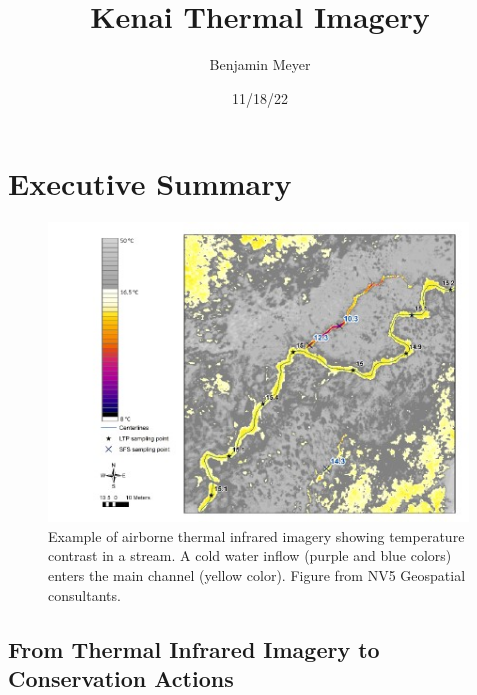 \documentclass[
  letterpaper,
  DIV=11,
  numbers=noendperiod]{scrreprt}
\title{Kenai Thermal Imagery}
\author{Benjamin Meyer}
\date{11/18/22}
\renewcommand*\contentsname{Table of contents}
\newcommand\contentsname{Table of contents}
\begin{document}
\maketitle
\ifdefined\Shaded\renewenvironment{Shaded}{\begin{tcolorbox}[boxrule=0pt, borderline west={3pt}{0pt}{shadecolor}, frame hidden, enhanced, breakable, sharp corners, interior hidden]}{\end{tcolorbox}}\fi

\renewcommand*\contentsname{Table of contents}
{
\hypersetup{linkcolor=}
\setcounter{tocdepth}{2}
\tableofcontents
}

\hypertarget{executive-summary}{%
\chapter*{Executive Summary}\label{executive-summary}}


\begin{figure}

{\centering \includegraphics[width=\textwidth,height=3.125in]{./images/example_TIR_figure.jpg}

}

\caption{Example of airborne thermal infrared imagery showing
temperature contrast in a stream. A cold water inflow (purple and blue
colors) enters the main channel (yellow color). Figure from NV5
Geospatial consultants.}

\end{figure}

\hypertarget{from-thermal-infrared-imagery-to-conservation-actions}{%
\section*{From Thermal Infrared Imagery to Conservation
Actions}\label{from-thermal-infrared-imagery-to-conservation-actions}}
\end{document}
